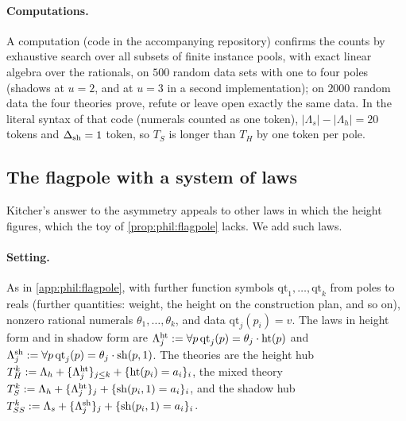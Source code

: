 \paragraph{Computations.}
A computation (code in the accompanying repository) confirms the counts by exhaustive search over all subsets of finite instance pools, with exact linear algebra over the rationals, on $500$ random data sets with one to four poles (shadows at $u=2$, and at $u=3$ in a second implementation); on $2000$ random data the four theories prove, refute or leave open exactly the same data. In the literal syntax of that code (numerals counted as one token), $\lvert\Lambda_s\rvert-\lvert\Lambda_h\rvert=20$ tokens and $\Delta_{\rm sh}=1$ token, so $T_S$ is longer than $T_H$ by one token per pole.

\subsection{The flagpole with a system of laws}\label{app:phil:system}

Kitcher's answer to the asymmetry appeals to other laws in which the height figures, which the toy of \cref{prop:phil:flagpole} lacks. We add such laws.

\paragraph{Setting.} As in \cref{app:phil:flagpole}, with further function symbols $\mathrm{qt}_1,\dots,\mathrm{qt}_k$ from poles to reals (further quantities: weight, the height on the construction plan, and so on), nonzero rational numerals $\theta_1,\dots,\theta_k$, and data $\mathrm{qt}_j(p_i)=v$. The laws in height form and in shadow form are $\Lambda^{\rm ht}_j:=\forall p\,\mathrm{qt}_j(p)=\theta_j\cdot\mathrm{ht}(p)$ and $\Lambda^{\rm sh}_j:=\forall p\,\mathrm{qt}_j(p)=\theta_j\cdot\mathrm{sh}(p,1)$. The theories are the height hub $T^k_H:=\Lambda_h+\{\Lambda^{\rm ht}_j\}_{j\le k}+\{\mathrm{ht}(p_i)=a_i\}_i$, the mixed theory $T^k_S:=\Lambda_h+\{\Lambda^{\rm ht}_j\}_j+\{\mathrm{sh}(p_i,1)=a_i\}_i$, and the shadow hub $T^k_{SS}:=\Lambda_s+\{\Lambda^{\rm sh}_j\}_j+\{\mathrm{sh}(p_i,1)=a_i\}_i$.


